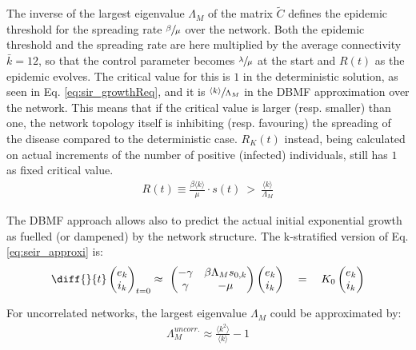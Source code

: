 \documentclass[DIV=12, BCOR=0pt]{scrartcl}  %
\begin{document}
  The inverse of the largest eigenvalue $\Lambda_M$ of the matrix $\tilde{C}$ defines the epidemic threshold for the spreading rate $\sfrac{\beta}{\mu}$ over the network. Both the epidemic threshold and the spreading rate are here multiplied by the average connectivity $\bar{k} = 12$, so that the control parameter becomes $\sfrac{\lambda}{\mu}$ at the start and $R(t)$ as the epidemic evolves. The critical value for this is $1$ in the deterministic solution, as seen in Eq. \ref{eq:sir_growthReq}, and it is $\sfrac{\langle k \rangle}{\Lambda_M}$ in the DBMF approximation over the network. This means that if the critical value is larger (resp. smaller) than one, the network topology itself is inhibiting (resp. favouring) the spreading of the disease compared to the deterministic case. $R_K(t)$ instead, being calculated on actual increments of the number of positive (infected) individuals, still has $1$ as fixed critical value.
  \begin{align}
		 R(t) \equiv \frac{\beta \langle k \rangle }{\mu} \cdot s(t) \ > \ \frac{\langle k \rangle}{\Lambda_M}
  \end{align}
  
  The DBMF approach allows also to predict the actual initial exponential growth as fuelled (or dampened) by the network structure. The k-stratified version of Eq. \ref{eq:seir_approxi} is:
  \begin{align}
    	\diff{}{t}
	  \begin{pmatrix}
	  	e_k \\
	  	i_k
	  \end{pmatrix}_{t=0}
	  \approx \
	  \begin{pmatrix}
	  	- \gamma & \beta \Lambda_M s_{0,k} \\
	  	\gamma & - \mu
	  \end{pmatrix}
	  \begin{pmatrix}
	  	e_k \\
	  	i_k
	  \end{pmatrix}
	  \quad = \quad K_0 %
	  \begin{pmatrix}
	  	e_k \\
	  	i_k
	  \end{pmatrix} %
	  \label{eq:seir_approxiDBMF}
  \end{align}
  
  For uncorrelated networks, the largest eigenvalue $\Lambda_M$ could be approximated by:
  \begin{align}
  	\Lambda_M^{uncorr.} \approx \frac{\langle k^2 \rangle}{\langle k \rangle} - 1
  \end{align}
\end{document}
